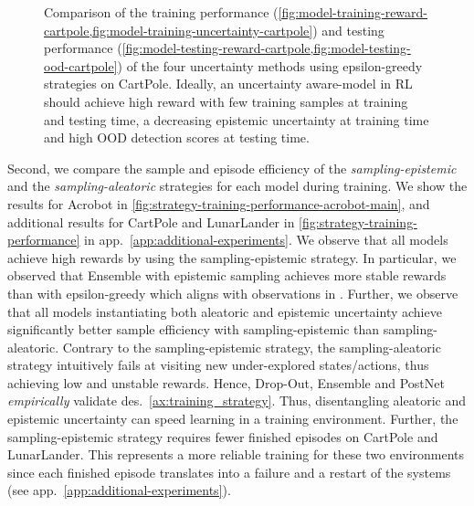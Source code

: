 \begin{figure}
\begin{subfigure}{.23\textwidth}
    \end{subfigure}
    \caption{Comparison of the training performance (\cref{fig:model-training-reward-cartpole,fig:model-training-uncertainty-cartpole}) and testing performance (\cref{fig:model-testing-reward-cartpole,fig:model-testing-ood-cartpole}) of the four uncertainty methods using epsilon-greedy strategies on CartPole. Ideally, an uncertainty aware-model in RL should achieve high reward with few training samples at training and testing time, a decreasing epistemic uncertainty at training time and high OOD detection scores at testing time.}
    \label{fig:model-training-testing-performance-cartpole-main}
\end{figure}

Second, we compare the sample and episode efficiency of the \emph{sampling-epistemic} and the \emph{sampling-aleatoric} strategies for each model during training. We show the results for Acrobot in \cref{fig:strategy-training-performance-acrobot-main}, and additional results for CartPole and LunarLander in \cref{fig:strategy-training-performance} in app.~\ref{app:additional-experiments}. We observe that all models achieve high rewards by using the sampling-epistemic strategy. In particular, we observed that Ensemble with epistemic sampling achieves more stable rewards than with epsilon-greedy which aligns with observations in \citet{bootstrapped-dqn}. Further, we observe that all models instantiating both aleatoric and epistemic uncertainty achieve significantly better sample efficiency with sampling-epistemic than sampling-aleatoric. Contrary to the sampling-epistemic strategy, the sampling-aleatoric strategy intuitively fails at visiting new under-explored states/actions, thus achieving low and unstable rewards. Hence, Drop-Out, Ensemble and PostNet \emph{empirically} validate des.~\ref{ax:training_strategy}. Thus, disentangling aleatoric and epistemic uncertainty can speed learning in a training environment. Further, the sampling-epistemic strategy requires fewer finished episodes on CartPole and LunarLander. This represents a more reliable training for these two environments since each finished episode translates into a failure and a restart of the systems (see app.~\ref{app:additional-experiments}).

%

% 
%

